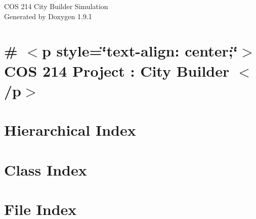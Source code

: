 \let\mypdfximage\pdfximage\def\pdfximage{\immediate\mypdfximage}\documentclass[twoside]{book}
\newcommand{\+}{\discretionary{\mbox{\scriptsize$\hookleftarrow$}}{}{}}
\newcommand{\clearemptydoublepage}{%
  \newpage{\pagestyle{empty}\cleardoublepage}%
}
\begin{document}
\raggedbottom

\hypersetup{pageanchor=false,
             bookmarksnumbered=true,
             pdfencoding=unicode
            }
\begin{titlepage}
\vspace*{7cm}
\begin{center}%
{\Large COS 214 City Builder Simulation }\\
\vspace*{1cm}
{\large Generated by Doxygen 1.9.1}\\
\end{center}
\end{titlepage}
\clearemptydoublepage
{}
\tableofcontents
\clearemptydoublepage
{}
\hypersetup{pageanchor=true}

\chapter{\# $<$p style=\char`\"{}text-\/align\+: center;\char`\"{}$>$ COS 214 Project \+: City Builder $<$/p$>$}
\label{md__home_nev_cos214_Project_finalpush_Team_8_Design_Wits_System_README}

\chapter{Hierarchical Index}

\chapter{Class Index}

\chapter{File Index}

\end{document}
